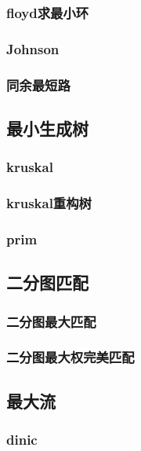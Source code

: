 ﻿\documentclass[a4paper,twocolumn]{article}
\begin{document}
\subsubsection{floyd求最小环}

\subsubsection{Johnson}

\subsubsection{同余最短路}

\subsection{最小生成树}
\subsubsection{kruskal}

\subsubsection{kruskal重构树}

\subsubsection{prim}

\subsection{二分图匹配}
\subsubsection{二分图最大匹配}

\subsubsection{二分图最大权完美匹配}

\subsection{最大流}
\subsubsection{dinic}

\end{document}
